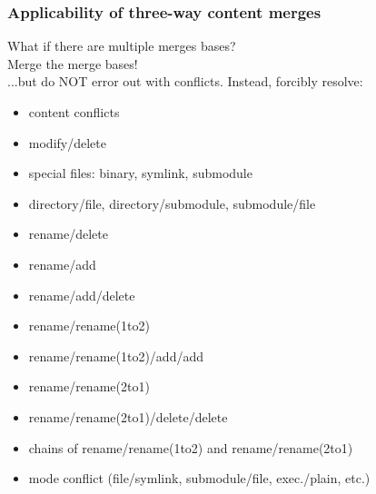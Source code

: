 \documentclass[t]{beamer}
\begin{document}

\begin{frame}
  \frametitle{Applicability of three-way content merges}

  What if there are multiple merges bases?
  \pause
  \\[\baselineskip]
  Merge the merge bases!
  \pause
  \\[\baselineskip]
  ...but do NOT error out with conflicts.  Instead, forcibly resolve:
  \pause
  \begin{itemize}[<+->]
    \item content conflicts
    \item modify/delete
    \item special files: binary, symlink, submodule
    \item directory/file, directory/submodule, submodule/file
    \item rename/delete
    \item rename/add
    \item rename/add/delete
    \item rename/rename(1to2)
    \item rename/rename(1to2)/add/add
    \item rename/rename(2to1)
    \item rename/rename(2to1)/delete/delete
    \item chains of rename/rename(1to2) and rename/rename(2to1)
    \item mode conflict (file/symlink, submodule/file, exec./plain, etc.)
  \end{itemize}

\end{frame}

\end{document}
